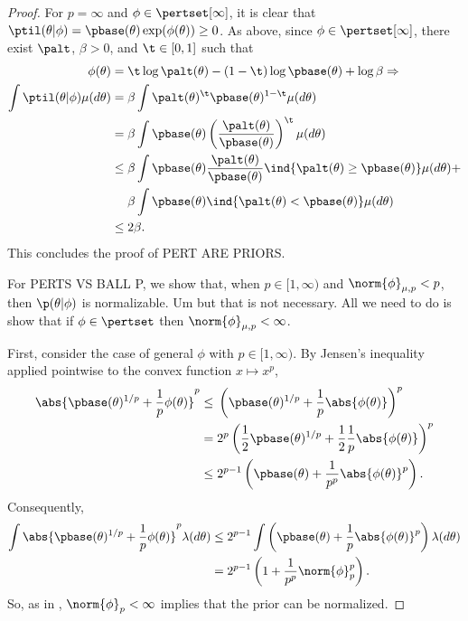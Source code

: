 \begin{proof}
For $p = \infty$ and $\phi \in \pertset[\infty]$, it is clear that $\ptil(\theta
\vert \phi) = \pbase(\theta) \exp(\phi(\theta)) \ge 0$. As above, since $\phi
\in \pertset[\infty]$, there exist $\palt$, $\beta > 0$, and $\t \in [0,1]$ such
that
%
\begin{align*}
%
\phi(\theta) ={}&
    \t \log \palt(\theta) - (1-\t)\log \pbase(\theta) + \log \beta \Rightarrow\\
%
\int \ptil(\theta \vert \phi)\mu(d\theta) ={}&
    \beta \int \palt(\theta)^\t \pbase(\theta)^{1 - \t}\mu(d\theta)
\\={}&
\beta \int \pbase(\theta)
    \left( \frac{\palt(\theta)}{\pbase(\theta)}\right)^\t \mu(d\theta)
\\\le{}&
\beta \int \pbase(\theta)
    \frac{\palt(\theta)}{\pbase(\theta)}
    \ind{\palt(\theta) \ge \pbase(\theta)} \mu(d\theta) +
\\&
  \beta \int \pbase(\theta)
    \ind{\palt(\theta) < \pbase(\theta)} \mu(d\theta)
\\\le{}& 2\beta.
%
\end{align*}
%
This concludes the proof of PERT ARE PRIORS.

For PERTS VS BALL P, we show that, when $p \in [1, \infty)$ and
$\norm{\phi}_{\mu,p} < p$, then $\p(\theta \vert \phi)$ is normalizable. Um but
that is not necessary.  All we need to do is show that if $\phi \in \pertset$
then $\norm{\phi}_{\mu,p} < \infty$.

First, consider the case of general $\phi$ with $p \in [1, \infty)$. By Jensen's
inequality applied pointwise to the convex function $x \mapsto x^p$,
%
\begin{align*}
%
\abs{\pbase(\theta)^{1/p} + \frac{1}{p}\phi(\theta) }^{p} \le{}&
    \left(\pbase(\theta)^{1/p} + \frac{1}{p}\abs{\phi(\theta)} \right)^{p}
\\={}&
    2^p \left(\frac{1}{2}\pbase(\theta)^{1/p} +
              \frac{1}{2} \frac{1}{p}\abs{\phi(\theta)} \right)^{p}
\\\le{}&
    2^{p-1} \left(\pbase(\theta) + \frac{1}{p^p}\abs{\phi(\theta)}^p \right).
%
\end{align*}
%
Consequently,
%
\begin{align*}
%
\int \abs{\pbase(\theta)^{1/p} + \frac{1}{p}\phi(\theta) }^{p}
    \lambda(d\theta) \le{}&
2^{p-1} \int \left(\pbase(\theta) + \frac{1}{p}\abs{\phi(\theta)}^p \right)
    \lambda(d\theta)
\\={}&
    2^{p-1} \left(1 + \frac{1}{p^p}\norm{\phi}_p^p\right).
%
\end{align*}
%
So, as in \citep[Result 2]{gustafson:1996:local}, $\norm{\phi}_p < \infty$
implies that the prior can be normalized.


\end{proof}
